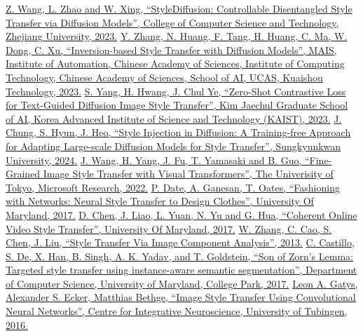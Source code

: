 \documentclass{article}
\begin{document}
\begin{thebibliography}{9} 
    \href{https://arxiv.org/pdf/2308.07863}{Z. Wang, L. Zhao and W. Xing, “StyleDiffusion: Controllable Disentangled Style Transfer via Diffusion Models”, College of Computer Science and Technology, Zhejiang University, 2023.}
     \href{https://openaccess.thecvf.com/content/CVPR2023/papers/Zhang_Inversion-Based_Style_Transfer_With_Diffusion_Models_CVPR_2023_paper.pdf}{Y. Zhang, N. Huang, F. Tang, H. Huang, C. Ma, W. Dong, C. Xu, “Inversion-based Style Transfer with Diffusion Models”, MAIS, Institute of Automation, Chinese Academy of Sciences, Institute of Computing Technology, Chinese Academy of Sciences, School of AI, UCAS, Kuaishou Technology, 2023.}
     \href{https://openaccess.thecvf.com/content/ICCV2023/papers/Yang_Zero-Shot_Contrastive_Loss_for_Text-Guided_Diffusion_Image_Style_Transfer_ICCV_2023_paper.pdf}{S. Yang, H. Hwang, J. Chul Ye, “Zero-Shot Contrastive Loss for Text-Guided Diffusion Image Style Transfer”, Kim Jaechul Graduate School of AI, Korea Advanced Institute of Science and Technology (KAIST), 2023.}
    \href{https://arxiv.org/pdf/2312.09008}{J. Chung, S. Hyun, J. Heo, “Style Injection in Diffusion: A Training-free Approach
    for Adapting Large-scale Diffusion Models for Style Transfer”, Sungkyunkwan University, 2024.}
    \href{https://arxiv.org/pdf/2210.05176v1}{J. Wang, H. Yang, J. Fu, T. Yamasaki and B. Guo, “Fine-Grained Image Style Transfer
    with Visual Transformers”,  The Univerisity of Tokyo, Microsoft Research, 2022.}
    \href{https://arxiv.org/pdf/1707.09899}{P. Date, A. Ganesan, T. Oates, “Fashioning with Networks: Neural Style Transfer to Design
    Clothes”,  University Of Maryland, 2017.}
    \href{https://arxiv.org/pdf/1703.09211}{D. Chen, J. Liao, L. Yuan, N. Yu and G. Hua, “Coherent Online Video Style Transfer”,  University Of Maryland, 2017.}
     \href{https://www.researchgate.net/publication/234096926_Style_Transfer_Via_Im  age_Component_Analysis}{W. Zhang, C. Cao, S. Chen, J. Liu, “Style Transfer Via Image Component Analysis”,  2013.}
    \href{https://arxiv.org/pdf/1701.02357}{C. Castillo, S. De, X. Han, B. Singh, A. K. Yadav, and T. Goldstein, “Son of Zorn’s Lemma: Targeted style transfer using instance-aware semantic segmentation”, Department of Computer Science, University of Maryland, College Park, 2017.}
    \href{https://www.cv-foundation.org/openaccess/content_cvpr_2016/papers/Gatys_Image_Style_Transfer_CVPR_2016_paper.pdf}{Leon A. Gatys, Alexander S. Ecker, Matthias Bethge, “Image Style Transfer Using Convolutional Neural Networks”, Centre for Integrative Neuroscience, University of Tubingen, 2016.}

\end{thebibliography}
\end{document}
